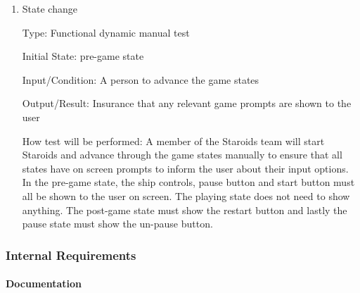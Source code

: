 \documentclass[12pt, titlepage]{article}
\begin{document}
\begin{enumerate}

\item{State change\\}

Type: Functional dynamic manual test

Initial State: pre-game state

Input/Condition: A person to advance the game states

Output/Result: Insurance that any relevant game prompts are shown to the user

How test will be performed: A member of the Staroids team will start Staroids and advance through the game states manually to ensure that all states have on screen prompts to inform the user about their input options. In the pre-game state, the ship controls, pause button and start button must all be shown to the user on screen. The playing state does not need to show anything. The post-game state must show the restart button and lastly the pause state must show the un-pause button.

\end{enumerate}

\subsubsection{Internal Requirements}

\paragraph{Documentation}
\end{document}
